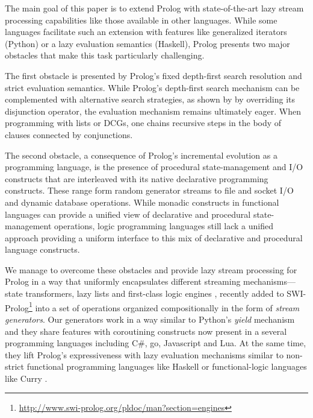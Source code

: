 \documentclass{new_tlp}
\begin{document}
The main goal of this paper is to extend Prolog with state-of-the-art lazy
stream processing capabilities like those available in other languages.
While some languages facilitate such an extension with features like
generalized iterators (Python) or a lazy evaluation semantics (Haskell), 
Prolog presents two major obstacles that make this task particularly challenging.

The first obstacle is presented by Prolog's fixed depth-first search resolution
and strict evaluation semantics. While Prolog's depth-first search mechanism
can be complemented with alternative search strategies, as shown by 
by overriding its disjunction operator, the evaluation mechanism remains
ultimately eager. When programming with lists or DCGs, one chains recursive
steps in the body of clauses connected by conjunctions. 

The second obstacle, a consequence of Prolog's incremental evolution as a
programming language, is the presence of procedural state-management and I/O
constructs that are interleaved with its native declarative programming
constructs. These range form random generator streams to file and socket I/O
and dynamic database operations.  While monadic constructs in functional
languages \cite{moggi:monads,wadler93:cont}  can provide  a unified view of
declarative and procedural state-management operations, logic programming
languages still lack a unified approach providing a uniform interface to this
mix of declarative and procedural language constructs.

 
We manage to overcome these obstacles and provide lazy stream
processing for Prolog in a way that uniformly encapsulates
different streaming mechanisms---state transformers, lazy lists and first-class logic engines 
\cite{tarau:cl2000,padl09inter,bp2011}, 
recently added to SWI-Prolog\footnote{
\url{http://www.swi-prolog.org/pldoc/man?section=engines}} into a set of operations organized compositionally in the form of {\em 
stream generators}.
Our generators work in a way similar to Python's {\em yield} mechanism \cite{pyref,beazley09} and 
they share features with coroutining constructs now present in a several  programming languages including C\#, go, Javascript and Lua. At the same time, 
they lift Prolog's expressiveness with lazy evaluation mechanisms similar to non-strict
functional programming languages like Haskell \cite{hudak07} or functional-logic languages like Curry \cite{antoy05}.
\end{document}

